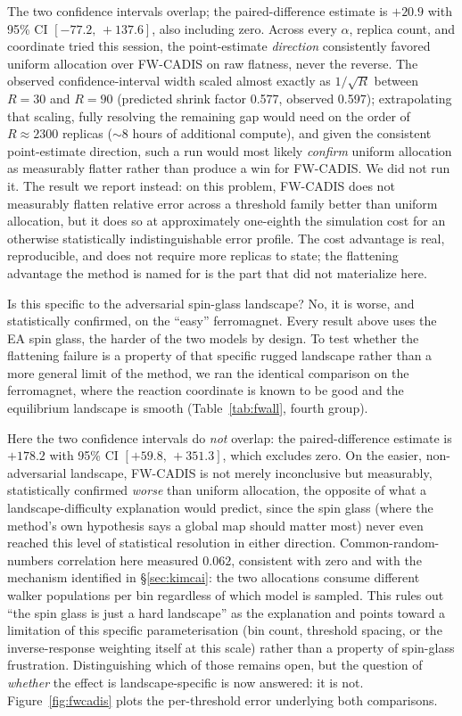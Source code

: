 \documentclass[a4paper,fleqn]{cas-sc}
\begin{document}
The two confidence intervals overlap; the paired-difference estimate is $+20.9$ with 95\%
CI $[-77.2,\,+137.6]$, also including zero. Across every $\alpha$, replica count, and
coordinate tried this session, the point-estimate \emph{direction} consistently favored
uniform allocation over FW-CADIS on raw flatness, never the reverse. The observed
confidence-interval width scaled almost exactly as $1/\sqrt{R}$ between $R=30$ and $R=90$
(predicted shrink factor 0.577, observed 0.597); extrapolating that scaling, fully resolving
the remaining gap would need on the order of $R\approx2300$ replicas ($\sim$8 hours of
additional compute), and given the consistent point-estimate direction, such a run would
most likely \emph{confirm} uniform allocation as measurably flatter rather than produce a
win for FW-CADIS. We did not run it. The result we report instead: on this problem,
	FW-CADIS does not measurably flatten relative error across a threshold family better than
	uniform allocation, but it does so at approximately one-eighth the simulation cost for an
	otherwise statistically indistinguishable error profile. The cost advantage is real,
reproducible, and does not require more replicas to state; the flattening advantage the
method is named for is the part that did not materialize here.

Is this specific to the adversarial spin-glass landscape? No, it is worse, and
	statistically confirmed, on the ``easy'' ferromagnet. Every result above uses the EA spin
glass, the harder of the two models by design. To test whether the flattening failure is a
property of that specific rugged landscape rather than a more general limit of the method,
we ran the identical comparison on the ferromagnet, where the reaction coordinate is known
to be good and the equilibrium landscape is smooth (Table~\ref{tab:fwall}, fourth group).

Here the two confidence intervals do \emph{not} overlap: the paired-difference estimate is
$+178.2$ with 95\% CI $[+59.8,\,+351.3]$, which excludes zero. On the easier,
	non-adversarial landscape, FW-CADIS is not merely inconclusive but measurably, statistically
	confirmed \emph{worse} than uniform allocation, the opposite of what a
landscape-difficulty explanation would predict, since the spin glass (where the method's
own hypothesis says a global map should matter most) never even reached this level of
statistical resolution in either direction. Common-random-numbers correlation here measured
$0.062$, consistent with zero and with the mechanism identified in \S\ref{sec:kimcai}: the
two allocations consume different walker populations per bin regardless of which model is
sampled. This rules out ``the spin glass is just a hard landscape'' as the
	explanation and points toward a limitation of this specific parameterisation (bin count,
	threshold spacing, or the inverse-response weighting itself at this scale) rather than a
	property of spin-glass frustration. Distinguishing which of those remains open, but the
question of \emph{whether} the effect is landscape-specific is now answered: it is not.
Figure~\ref{fig:fwcadis} plots the per-threshold error underlying both comparisons.
\end{document}
